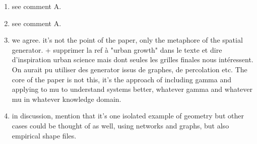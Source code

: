 \documentclass[11pt,a4paper,sans]{moderncv}        %
\begin{document}
\begin{enumerate}
  \item see comment A. 

  \item see comment A. 

  \item we agree. it's not the point of the paper, only the metaphore of the spatial generator. + supprimer la ref à "urban growth" dans le texte et dire d'inspiration urban science mais dont seules les grilles finales nous intéressent. On aurait pu utiliser des generator issus de graphes, de percolation etc.
  The core of the paper is not this, it's the approach of including gamma and applying to mu to understand systems better, whatever gamma and whatever mu in whatever knowledge domain.
  
 \item in discussion, mention that it's one isolated example of geometry but other cases could be thought of as well, using networks and graphs, but also empirical shape files.
 

\end{enumerate}
\end{document}
